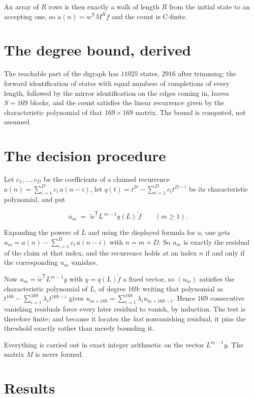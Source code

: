 \documentclass[11pt]{article}
\theoremstyle{definition}
\begin{document}
An array of $R$ rows is then exactly a walk of length $R$ from the initial state to an accepting one, so $a(n) = w^{\mathsf T}M^{R}f$ and the count is C-finite.

\section{The degree bound, derived}

The reachable part of the digraph has $11025$ states, $2916$ after trimming; the forward identification of states with equal numbers of completions of every length, followed by the mirror identification on the edges coming in, leaves $S = 169$ blocks, and the count satisfies the linear recurrence given by the characteristic polynomial of that $169\times169$ matrix. The bound is computed, not assumed.

\section{The decision procedure}

Let $c_1,\dots,c_D$ be the coefficients of a claimed recurrence $a(n) = \sum_{i=1}^{D} c_i\,a(n-i)$, let $q(t) = t^{D} - \sum_{i=1}^{D} c_i t^{D-i}$ be its characteristic polynomial, and put

\[u_m \;=\; \tilde w^{\mathsf T} L^{\,m-1} q(L)\,\tilde f \qquad (m \ge 1).\]

Expanding the powers of $L$ and using the displayed formula for $a$, one gets $u_m = a(n) - \sum_{i=1}^{D} c_i\,a(n-i)$ with $n = m + D$. So $u_m$ is exactly the residual of the claim at that index, and the recurrence holds at an index $n$ if and only if the corresponding $u_m$ vanishes.

Now $u_m = \tilde w^{\mathsf T} L^{m-1} y$ with $y = q(L)\tilde f$ a fixed vector, so $(u_m)$ satisfies the characteristic polynomial of $L$, of degree $169$: writing that polynomial as $t^{169} - \sum_{i=1}^{169} \lambda_i t^{169-i}$ gives $u_{m+169} = \sum_{i=1}^{169} \lambda_i u_{m+169-i}$. Hence $169$ consecutive vanishing residuals force every later residual to vanish, by induction. The test is therefore finite; and because it locates the {\itshape last} nonvanishing residual, it pins the threshold exactly rather than merely bounding it.

Everything is carried out in exact integer arithmetic on the vector $L^{m-1}y$. The matrix $M$ is never formed.

\section{Results}
\end{document}
